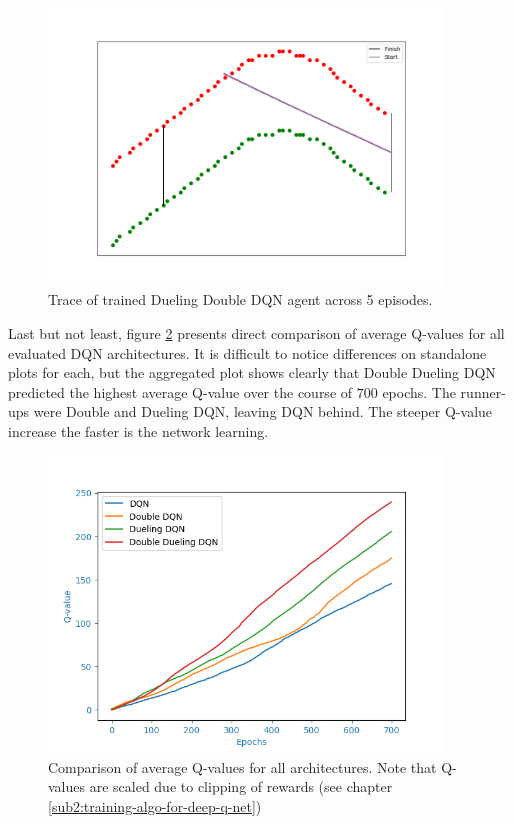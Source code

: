 \begin{figure}[h]
    \centering
    \includegraphics[width=10.5cm]{img/trace_double_ddqn.png}
    \caption{Trace of trained Dueling Double DQN agent across 5 episodes.}
    \label{fig:trace-dueling-double-dqn}
\end{figure}

Last but not least, figure \ref{fig:results-qval-comparison} presents direct comparison of average Q-values for all evaluated DQN architectures. It is difficult to notice differences on standalone plots for each, but the aggregated plot shows clearly that Double
Dueling DQN predicted the highest average Q-value over the course of $700$ epochs. The runner-ups were Double and Dueling DQN, leaving DQN behind. The steeper Q-value increase the faster is the network learning.

\begin{figure}[h]
    \centering
    \includegraphics[width=10.5cm]{img/cumulated_qval.png}
    \caption{Comparison of average Q-values for all architectures. Note that Q-values are scaled due to clipping of rewards (see chapter \ref{sub2:training-algo-for-deep-q-net})}
    \label{fig:results-qval-comparison}
\end{figure}